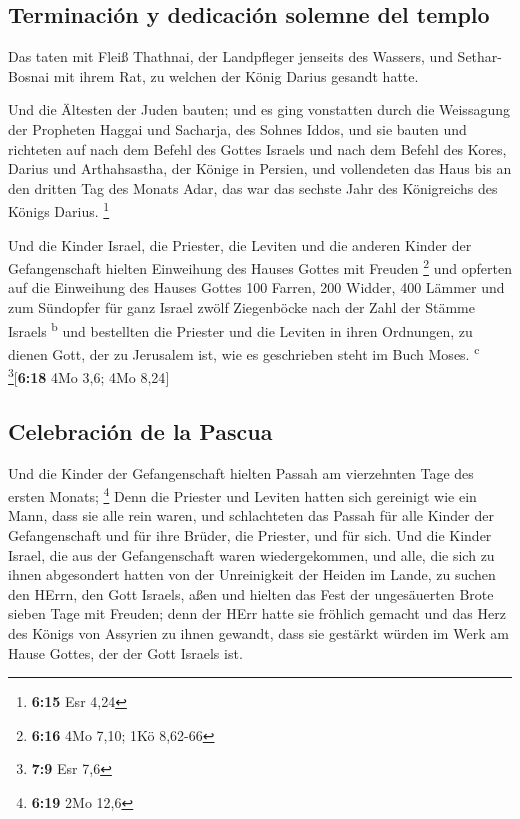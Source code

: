 \hypertarget{terminaciuxf3n-y-dedicaciuxf3n-solemne-del-templo}{%
\subsection{Terminación y dedicación solemne del
templo}\label{terminaciuxf3n-y-dedicaciuxf3n-solemne-del-templo}}

 Das taten mit Fleiß Thathnai, der Landpfleger jenseits
des Wassers, und Sethar-Bosnai mit ihrem Rat, zu welchen der König
Darius gesandt hatte.

 Und die Ältesten der Juden bauten; und es ging
vonstatten durch die Weissagung der Propheten Haggai und Sacharja, des
Sohnes Iddos, und sie bauten und richteten auf nach dem Befehl des
Gottes Israels und nach dem Befehl des Kores, Darius und Arthahsastha,
der Könige in Persien,  und vollendeten das Haus bis an
den dritten Tag des Monats Adar, das war das sechste Jahr des
Königreichs des Königs Darius. \footnote{\textbf{6:15} Esr 4,24}

 Und die Kinder Israel, die Priester, die Leviten und die
anderen Kinder der Gefangenschaft hielten Einweihung des Hauses Gottes
mit Freuden \footnote{\textbf{6:16} 4Mo 7,10; 1Kö 8,62-66}
 und opferten auf die Einweihung des Hauses Gottes 100
Farren, 200 Widder, 400 Lämmer und zum Sündopfer für ganz Israel zwölf
Ziegenböcke nach der Zahl der Stämme Israels \textsuperscript{b}
 und bestellten die Priester und die Leviten in ihren
Ordnungen, zu dienen Gott, der zu Jerusalem ist, wie es geschrieben
steht im Buch Moses. \textsuperscript{c} \footnote{\textbf{7:9} Esr 7,6}{[}\textbf{6:18}
4Mo 3,6; 4Mo 8,24{]}

\hypertarget{celebraciuxf3n-de-la-pascua}{%
\subsection{Celebración de la
Pascua}\label{celebraciuxf3n-de-la-pascua}}

 Und die Kinder der Gefangenschaft hielten Passah am
vierzehnten Tage des ersten Monats; \footnote{\textbf{6:19} 2Mo 12,6}
 Denn die Priester und Leviten hatten sich gereinigt wie
ein Mann, dass sie alle rein waren, und schlachteten das Passah für alle
Kinder der Gefangenschaft und für ihre Brüder, die Priester, und für
sich.  Und die Kinder Israel, die aus der Gefangenschaft
waren wiedergekommen, und alle, die sich zu ihnen abgesondert hatten von
der Unreinigkeit der Heiden im Lande, zu suchen den HErrn, den Gott
Israels, aßen  und hielten das Fest der ungesäuerten
Brote sieben Tage mit Freuden; denn der HErr hatte sie fröhlich gemacht
und das Herz des Königs von Assyrien zu ihnen gewandt, dass sie gestärkt
würden im Werk am Hause Gottes, der der Gott Israels ist.

